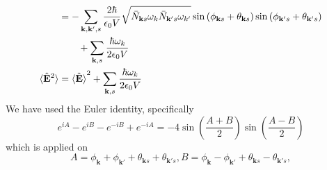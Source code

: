 \documentclass[../../../main.tex]{subfiles}
\begin{document}
\begin{align*}
   & =   - \sum_{\mathbf{k},\mathbf{k}',s} \frac{2\hbar }{\epsilon_0 V}\sqrt{\bar{N}_{\mathbf{k }s}\omega_k \bar{N}_{\mathbf{k}' s}\omega_{k'}}
  \sin \left( \phi_{\mathbf{k }s}+\theta_{\mathbf{k}s} \right)
  \sin \left( \phi_{\mathbf{k }'s}+\theta_{\mathbf{k}'s} \right)                                                                                                                                         \\
   & \qquad+ \sum_{\mathbf{k },s}\frac{\hbar \omega_k }{2\epsilon_0 V}                                                                                                                                   \\
  \braket{  \hat{\mathbf{E}}^2 }
   & = \braket{\hat{\mathbf{E}} }^2+\sum_{\mathbf{k },s}\frac{\hbar \omega_k }{2\epsilon_0 V}
\end{align*}
We have used the Euler identity, specifically
\begin{equation*}
  e^{iA} - e^{iB} - e^{-iB} + e^{-iA} = -4 \sin\left(\frac{A + B}{2}\right) \sin\left(\frac{A - B}{2}\right)
\end{equation*}
which is applied on
\begin{equation*}
  A = \phi_\mathbf{k} + \phi_{\mathbf{k}'} + \theta_{\mathbf{k}s} + \theta_{\mathbf{k}'s}, B= \phi_\mathbf{k} - \phi_{\mathbf{k}'} + \theta_{\mathbf{k}s} - \theta_{\mathbf{k}'s},
\end{equation*}
\end{document}
